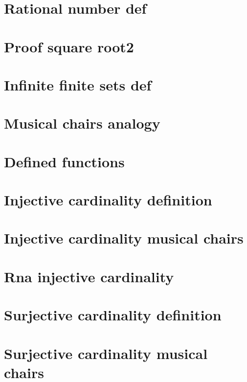 \section*{Rational number def}

\vfill
\section*{Proof square root2}

\vfill
\section*{Infinite finite sets def}

\vfill
\section*{Musical chairs analogy}

\vfill
\section*{Defined functions}

\vfill
\section*{Injective cardinality definition}

\vfill
\section*{Injective cardinality musical chairs}

\vfill
\section*{Rna injective cardinality}

\vfill
\section*{Surjective cardinality definition}

\vfill
\section*{Surjective cardinality musical chairs}

\vfill

